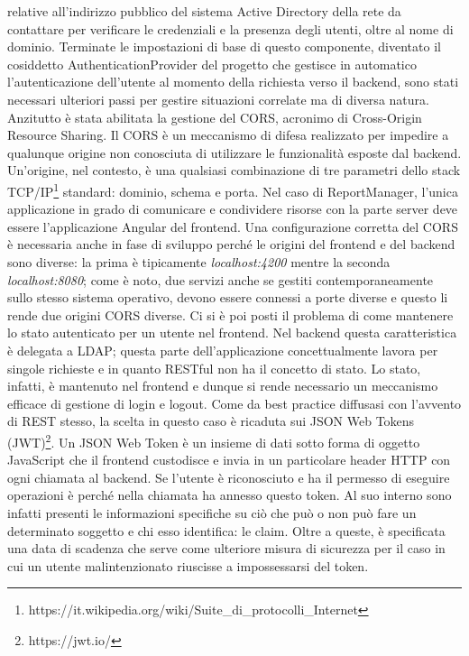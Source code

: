 relative all'indirizzo pubblico del sistema Active Directory della rete da contattare per verificare le credenziali e la presenza degli utenti, oltre al nome di dominio.
Terminate le impostazioni di base di questo componente, diventato il cosiddetto AuthenticationProvider del progetto che gestisce in automatico
l'autenticazione dell'utente al momento della richiesta verso il backend, sono stati necessari ulteriori passi per gestire situazioni correlate ma di diversa natura.
Anzitutto è stata abilitata la gestione del CORS, acronimo di Cross-Origin Resource Sharing.
Il CORS è un meccanismo di difesa realizzato per impedire a qualunque origine non conosciuta di utilizzare le funzionalità esposte dal backend.
Un'origine, nel contesto, è una qualsiasi combinazione di tre parametri dello stack TCP/IP\footnote{https://it.wikipedia.org/wiki/Suite\_di\_protocolli\_Internet} standard: 
dominio, schema e porta.
Nel caso di ReportManager, l'unica applicazione in grado di comunicare e condividere risorse con la parte server deve essere l'applicazione Angular del frontend.
Una configurazione corretta del CORS è necessaria anche in fase di sviluppo perché le origini del frontend e del backend sono diverse: la prima è tipicamente \emph{localhost:4200} 
mentre la seconda \emph{localhost:8080}; come è noto, due servizi anche se gestiti contemporaneamente sullo stesso sistema operativo, devono essere connessi a porte diverse e questo 
li rende due origini CORS diverse.
Ci si è poi posti il problema di come mantenere lo stato autenticato per un utente nel frontend.
Nel backend questa caratteristica è delegata a LDAP; questa parte dell'applicazione concettualmente lavora per singole richieste e in quanto RESTful non ha il concetto di stato.
Lo stato, infatti, è mantenuto nel frontend e dunque si rende necessario un meccanismo efficace di gestione di login e logout.
Come da best practice diffusasi con l'avvento di REST stesso, la scelta in questo caso è ricaduta sui JSON Web Tokens (JWT)\footnote{https://jwt.io/}.
Un JSON Web Token è un insieme di dati sotto forma di oggetto JavaScript che il frontend custodisce e invia in un particolare header HTTP con ogni chiamata al backend.
Se l'utente è riconosciuto e ha il permesso di eseguire operazioni è perché nella chiamata ha annesso questo token.
Al suo interno sono infatti presenti le informazioni specifiche su ciò che può o non può fare un determinato soggetto e chi esso identifica: le claim.
Oltre a queste, è specificata una data di scadenza che serve come ulteriore misura di sicurezza per il caso in cui un utente malintenzionato riuscisse a impossessarsi del token.
